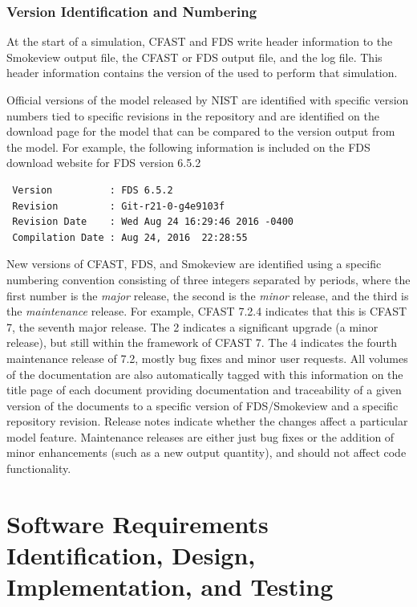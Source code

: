 \documentclass[11pt]{book}
\begin{document}
\subsection{Version Identification and Numbering}

At the start of a simulation, CFAST and FDS write header information to the Smokeview output file, the CFAST or FDS output file, and the log file.  This header information contains the version of the used to perform that simulation.

Official versions of the model released by NIST are identified with specific version numbers tied to specific revisions in the repository and are identified on the download page for the model that can be compared to the version output from the model. For example, the following information is included on the FDS download website for FDS version 6.5.2

\begin{lstlisting}
 Version          : FDS 6.5.2
 Revision         : Git-r21-0-g4e9103f
 Revision Date    : Wed Aug 24 16:29:46 2016 -0400
 Compilation Date : Aug 24, 2016  22:28:55
\end{lstlisting}

New versions of CFAST, FDS, and Smokeview are identified using a specific numbering convention consisting of three integers separated by periods, where the first number is the {\em major} release, the second is the {\em minor} release, and the third is the {\em maintenance} release. For example, CFAST 7.2.4 indicates that this is CFAST 7, the seventh major release. The 2 indicates a significant upgrade (a minor release), but still within the framework of CFAST 7.  The 4 indicates the fourth maintenance release of 7.2, mostly bug fixes and minor user requests. All volumes of the  documentation are also automatically tagged with this information on the title page of each document providing documentation and traceability of a given version of the documents to a specific version of FDS/Smokeview and a specific repository revision. Release notes indicate whether the changes affect a particular model feature. Maintenance releases are either just bug fixes or the addition of minor enhancements (such as a new output quantity), and should not affect code functionality.



\chapter{Software Requirements Identification, Design, Implementation, and Testing}
\end{document}
